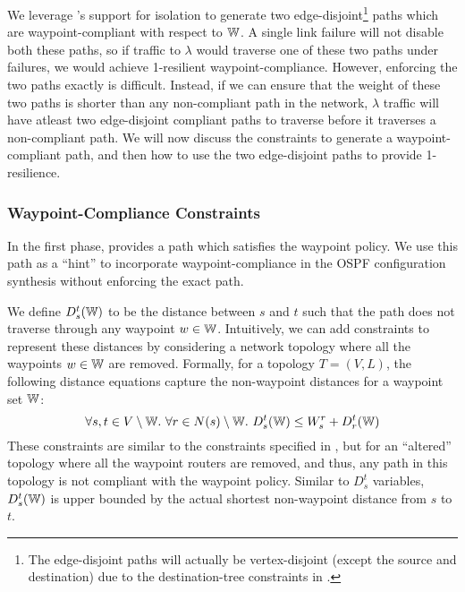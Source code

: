 We leverage \genesis's
support for isolation to generate two edge-disjoint\footnote
{The edge-disjoint paths will actually be vertex-disjoint (except the 
	source and destination) due to the destination-tree constraints
	in \genesis.} paths
which are waypoint-compliant with respect to $\mathbb{W}$. A single link
failure will not disable both these paths, so if traffic to $\lambda$ 
would 
traverse one of these two paths under failures, 
we would achieve 1-resilient
waypoint-compliance. However, enforcing the two paths exactly
is difficult. Instead, if we can ensure that the weight
of these two paths is shorter than any non-compliant path in 
the network, $\lambda$ traffic will have atleast two edge-disjoint 
compliant paths to traverse 
before it traverses a non-compliant path. We will now discuss the
constraints to generate a waypoint-compliant path, and then 
how to use the two edge-disjoint paths to provide 1-resilience. 


\subsubsection{Waypoint-Compliance Constraints}
In the first phase, \genesis provides a path which
satisfies the waypoint policy. We use this path as a 
``hint'' to incorporate waypoint-compliance in the OSPF 
configuration synthesis without 
enforcing the exact path.

We define $D_s^t(\mathbb{W})$ to be the 
distance between $s$ and $t$ such that the path does not
 traverse through any waypoint $w \in \mathbb{W}$. Intuitively, we
  can add constraints to represent these distances by
  considering a network topology where all the  
  waypoints $w \in \mathbb{W}$ are removed. Formally, for a topology 
 $T = (V,L)$, the following distance equations 
 capture the non-waypoint distances 
 for a waypoint set $\mathbb{W}$:
\begin{equation} \label{eq:wdistance}
\forall s, t \in V \setminus \mathbb{W}. ~\forall r \in N(s) \setminus \mathbb{W}.~
D_s^t(\mathbb{W}) \leq W_s^r + D_r^t(\mathbb{W})
\end{equation}
These constraints are similar to the constraints specified in
, but for an ``altered'' topology where all
the waypoint routers are removed, and thus, any path in this 
topology is not compliant with the waypoint policy. 
Similar to $D_s^t$ variables, 
$D_s^t(\mathbb{W})$ is upper bounded by the actual shortest non-waypoint distance from $s$ to $t$.

